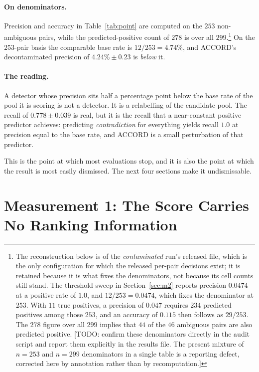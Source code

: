 \paragraph{On denominators.} Precision and accuracy in Table~\ref{tab:point} are
computed on the $253$ non-ambiguous pairs, while the predicted-positive count of
$278$ is over all $299$.\footnote{The reconstruction below is of the
\emph{contaminated} run's released file, which is the only configuration for
which the released per-pair decisions exist; it is retained because it is what
fixes the denominators, not because its cell counts still stand. The
threshold sweep in Section~\ref{sec:m2} reports precision $0.0474$ at a
positive rate of $1.0$, and $12/253 = 0.0474$, which fixes the denominator at
$253$. With $11$ true positives, a precision of $0.047$ requires $234$ predicted
positives among those $253$, and an accuracy of $0.115$ then follows as
$29/253$. The $278$ figure over all $299$ implies that $44$ of the $46$
ambiguous pairs are also predicted positive. [TODO: confirm these denominators
directly in the audit script and report them explicitly in the results file. The
present mixture of $n{=}253$ and $n{=}299$ denominators in a single table is a
reporting defect, corrected here by annotation rather than by recomputation.]}
On the $253$-pair basis the comparable base rate is $12/253 = 4.74\%$, and
ACCORD's decontaminated precision of $4.24\% \pm 0.23$ is \emph{below} it.

\paragraph{The reading.} A detector whose precision sits half a percentage point
below the base rate of the pool it is scoring is not a detector. It is a
relabelling of the candidate pool. The recall of $0.778 \pm 0.039$ is real, but
it is the recall that a near-constant positive predictor achieves: predicting
\emph{contradiction} for everything yields recall $1.0$ at precision equal to
the base rate, and ACCORD is a small perturbation of that predictor.

This is the point at which most evaluations stop, and it is also the point at
which the result is most easily dismissed. The next four sections make it
undismissable.

\section{Measurement 1: The Score Carries No Ranking Information}
\label{sec:m1}

